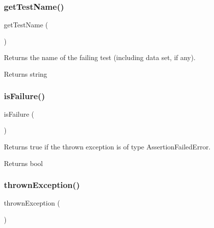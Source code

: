 \subsubsection{\texorpdfstring{get\+Test\+Name()}{getTestName()}}
{\footnotesize\ttfamily get\+Test\+Name (\begin{DoxyParamCaption}{ }\end{DoxyParamCaption})}

Returns the name of the failing test (including data set, if any).

\begin{DoxyReturn}{Returns}
string 
\end{DoxyReturn}
\mbox{\label{class_p_h_p_unit___framework___test_failure_aca7c2d13862869a3538adf2d6a8fc4f5}} 
\subsubsection{\texorpdfstring{is\+Failure()}{isFailure()}}
{\footnotesize\ttfamily is\+Failure (\begin{DoxyParamCaption}{ }\end{DoxyParamCaption})}

Returns true if the thrown exception is of type Assertion\+Failed\+Error.

\begin{DoxyReturn}{Returns}
bool 
\end{DoxyReturn}
\mbox{\label{class_p_h_p_unit___framework___test_failure_a957f1cb5c23dde4acd265af6a43c87a7}} 
\subsubsection{\texorpdfstring{thrown\+Exception()}{thrownException()}}
{\footnotesize\ttfamily thrown\+Exception (\begin{DoxyParamCaption}{ }\end{DoxyParamCaption})}

